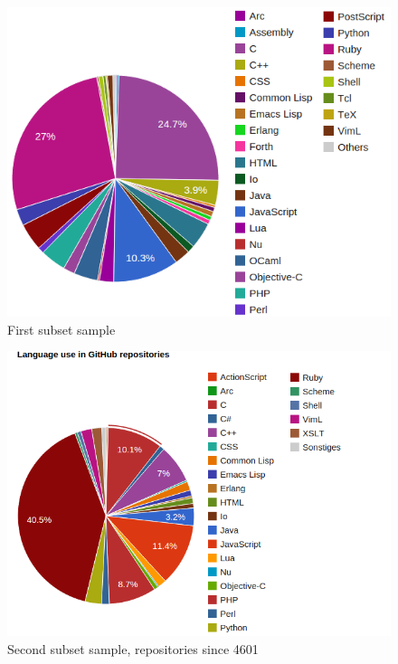 \begin{figure}[h]
    \centering
    \includegraphics[width=0.8\linewidth]{images/sample1.png}
    \caption{First subset sample}
    \label{fig:sample1}
\end{figure}

\begin{figure}[h]
    \centering
    \includegraphics[width=0.8\linewidth]{images/sample2-since-4601.png}
    \caption{Second subset sample, repositories since 4601}
    \label{fig:sample2}
\end{figure}

